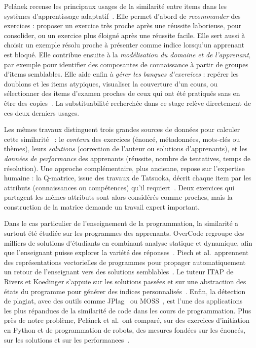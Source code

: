 Pelánek recense les principaux usages de la similarité entre items dans les systèmes d'apprentissage adaptatif~\cite{pelanek2020overview}. Elle permet d'abord de \emph{recommander} des exercices : proposer un exercice très proche après une réussite laborieuse, pour consolider, ou un exercice plus éloigné après une réussite facile. Elle sert aussi à choisir un exemple résolu proche à présenter comme indice lorsqu'un apprenant est bloqué. Elle contribue ensuite à la \emph{modélisation du domaine et de l'apprenant}, par exemple pour identifier des composantes de connaissance à partir de groupes d'items semblables. Elle aide enfin à \emph{gérer les banques d'exercices} : repérer les doublons et les items atypiques, visualiser la couverture d'un cours, ou sélectionner des items d'examen proches de ceux qui ont été pratiqués sans en être des copies~\cite{pelanek2020overview}. La substituabilité recherchée dans ce stage relève directement de ces deux derniers usages.

Les mêmes travaux distinguent trois grandes sources de données pour calculer cette similarité~\cite{pelanek2020overview} : le \emph{contenu} des exercices (énoncé, métadonnées, mots-clés ou thèmes), leurs \emph{solutions} (correction de l'auteur ou solutions d'apprenants), et les \emph{données de performance} des apprenants (réussite, nombre de tentatives, temps de résolution). Une approche complémentaire, plus ancienne, repose sur l'expertise humaine : la Q-matrice, issue des travaux de Tatsuoka, décrit chaque item par les attributs (connaissances ou compétences) qu'il requiert~\cite{gierl2007rulespace}. Deux exercices qui partagent les mêmes attributs sont alors considérés comme proches, mais la construction de la matrice demande un travail expert important.

Dans le cas particulier de l'enseignement de la programmation, la similarité a surtout été étudiée sur les programmes des apprenants. OverCode regroupe des milliers de solutions d'étudiants en combinant analyse statique et dynamique, afin que l'enseignant puisse explorer la variété des réponses~\cite{glassman2015overcode}. Piech et al.\ apprennent des représentations vectorielles de programmes pour propager automatiquement un retour de l'enseignant vers des solutions semblables~\cite{piech2015embeddings}. Le tuteur ITAP de Rivers et Koedinger s'appuie sur les solutions passées et sur une abstraction des états du programme pour générer des indices personnalisés~\cite{rivers2017itap}. Enfin, la détection de plagiat, avec des outils comme JPlag~\cite{prechelt2002jplag} ou MOSS~\cite{schleimer2003winnowing}, est l'une des applications les plus répandues de la similarité de code dans les cours de programmation. Plus près de notre problème, Pelánek et al.\ ont comparé, sur des exercices d'initiation en Python et de programmation de robots, des mesures fondées sur les énoncés, sur les solutions et sur les performances~\cite{pelanek2018programming}.

